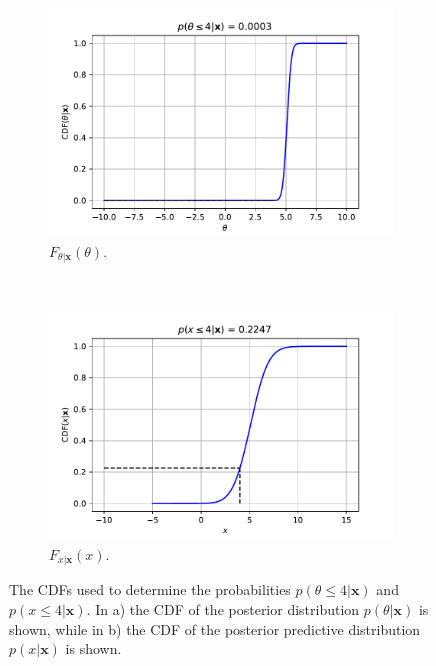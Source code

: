 \documentclass{article}
\begin{document}
\begin{figure}
     \centering
     \begin{subfigure}[b]{0.45\textwidth}
         \centering
         \includegraphics[width=\textwidth]{Q1b_15.pdf}
         \caption{$F_{\theta \vert \mathbf{x}}(\theta)$.}
     \end{subfigure}
     ~
     \begin{subfigure}[b]{0.45\textwidth}
         \centering
         \includegraphics[width=\textwidth]{Q1b_16.pdf}
         \caption{$F_{x \vert \mathbf{x}}(x)$.}
     \end{subfigure}
     
     \caption{The CDFs used to determine the probabilities $p(\theta \leq 4 \vert \mathbf{x})$ and $p(x \leq 4 \vert \mathbf{x})$. In a) the CDF of the posterior distribution $p(\theta \vert \mathbf{x})$ is shown, while in b) the CDF of the posterior predictive distribution $p(x \vert \mathbf{x})$ is shown.}
     \label{fig:Q1b_CDFs}
\end{figure}
\end{document}
